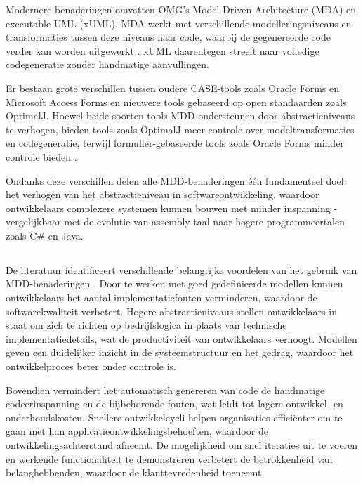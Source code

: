Modernere benaderingen omvatten OMG's Model Driven Architecture (MDA) en executable UML (xUML). MDA werkt met verschillende modelleringsniveaus en transformaties tussen deze niveaus naar code, waarbij de gegenereerde code verder kan worden uitgewerkt \autocite{Soley2000}. xUML daarentegen streeft naar volledige codegeneratie zonder handmatige aanvullingen.

Er bestaan grote verschillen tussen oudere CASE-tools zoals Oracle Forms en Microsoft Access Forms en nieuwere tools gebaseerd op open standaarden zoals OptimalJ. Hoewel beide soorten tools MDD ondersteunen door abstractieniveaus te verhogen, bieden tools zoals OptimalJ meer controle over modeltransformaties en codegeneratie, terwijl formulier-gebaseerde tools zoals Oracle Forms minder controle bieden \autocite{Henkel2010}.

Ondanks deze verschillen delen alle MDD-benaderingen één fundamenteel doel: het verhogen van het abstractieniveau in softwareontwikkeling, waardoor ontwikkelaars complexere systemen kunnen bouwen met minder inspanning - vergelijkbaar met de evolutie van assembly-taal naar hogere programmeertalen zoals C\# en Java.


\subsection{}%
De literatuur identificeert verschillende belangrijke voordelen van het gebruik van MDD-benaderingen \autocite{Soley2000}. Door te werken met goed gedefinieerde modellen kunnen ontwikkelaars het aantal implementatiefouten verminderen, waardoor de softwarekwaliteit verbetert. Hogere abstractieniveaus stellen ontwikkelaars in staat om zich te richten op bedrijfslogica in plaats van technische implementatiedetails, wat de productiviteit van ontwikkelaars verhoogt. Modellen geven een duidelijker inzicht in de systeemstructuur en het gedrag, waardoor het ontwikkelproces beter onder controle is.

Bovendien vermindert het automatisch genereren van code de handmatige codeerinspanning en de bijbehorende fouten, wat leidt tot lagere ontwikkel- en onderhoudskosten. Snellere ontwikkelcycli helpen organisaties efficiënter om te gaan met hun applicatieontwikkelingsbehoeften, waardoor de ontwikkelingsachterstand afneemt. De mogelijkheid om snel iteraties uit te voeren en werkende functionaliteit te demonstreren verbetert de betrokkenheid van belanghebbenden, waardoor de klanttevredenheid toeneemt.

